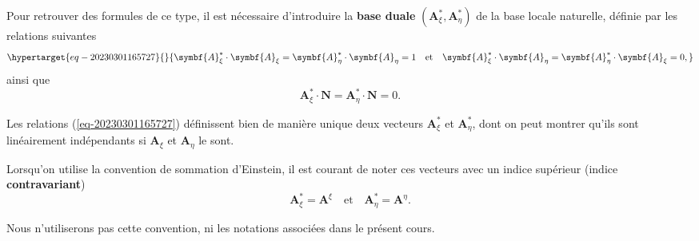 \documentclass[
  a4paper,
  DIV=11,
  numbers=noendperiod]{scrreprt}
\renewcommand{\vec}[1]{\symbf{#1}}
\begin{document}
Pour retrouver des formules de ce type, il est nécessaire d'introduire
la \textbf{base duale} \((\vec{A}_\xi^\ast, \vec{A}_\eta^\ast)\) de la
base locale naturelle, définie par les relations suivantes
\begin{equation}\protect\hypertarget{eq-20230301165727}{}{
\vec{A}_\xi^\ast \cdot \vec{A}_\xi = \vec{A}_\eta^\ast \cdot \vec{A}_\eta = 1
\quad \text{et} \quad
\vec{A}_\xi^\ast \cdot \vec{A}_\eta = \vec{A}_\eta^\ast \cdot \vec{A}_\xi = 0,
}\label{eq-20230301165727}\end{equation} ainsi que \[
\vec{A}_\xi^\ast \cdot \vec{N} = \vec{A}_\eta^\ast \cdot \vec{N} = 0.
\]

\begin{tcolorbox}[enhanced jigsaw, toptitle=1mm, title=\textcolor{quarto-callout-note-color}{\faInfo}\hspace{0.5em}{Note}, colbacktitle=quarto-callout-note-color!10!white, toprule=.15mm, left=2mm, bottomrule=.15mm, arc=.35mm, breakable, opacityback=0, colframe=quarto-callout-note-color-frame, bottomtitle=1mm, titlerule=0mm, leftrule=.75mm, opacitybacktitle=0.6, coltitle=black, rightrule=.15mm, colback=white]

Les relations (\ref{eq-20230301165727}) définissent bien de manière
unique deux vecteurs \(\vec{A}_\xi^\ast\) et \(\vec{A}_\eta^\ast\), dont
on peut montrer qu'ils sont linéairement indépendants si \(\vec{A}_\xi\)
et \(\vec{A}_\eta\) le sont.

Lorsqu'on utilise la convention de sommation d'Einstein, il est courant
de noter ces vecteurs avec un indice supérieur (indice
\textbf{contravariant}) \[
\vec{A}_\xi^\ast = \vec{A}^\xi \quad \text{et} \quad \vec{A}_\eta^\ast = \vec{A}^\eta.
\]

Nous n'utiliserons pas cette convention, ni les notations associées dans
le présent cours.

\end{tcolorbox}
\end{document}
